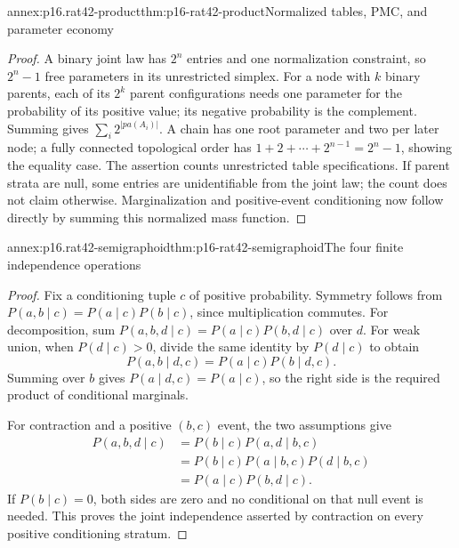 \begin{annexitem}{annex:p16.rat42-product}{thm:p16-rat42-product}{Normalized tables, PMC, and parameter economy}
\begin{proof}
A binary joint law has \(2^n\) entries and one normalization constraint,
so \(2^n-1\) free parameters in its unrestricted simplex. For a node
with \(k\) binary parents, each of its \(2^k\) parent configurations
needs one parameter for the probability of its positive value; its
negative probability is the complement. Summing gives
\(\sum_i2^{|pa(A_i)|}\). A chain has one root parameter and two
per later node; a fully connected topological order has
\(1+2+\cdots+2^{n-1}=2^n-1\), showing the equality case.
The assertion counts unrestricted table specifications. If parent
strata are null, some entries are unidentifiable from the joint law;
the count does not claim otherwise. Marginalization and positive-event
conditioning now follow directly by summing this normalized mass function.
\end{proof}
\end{annexitem}

\begin{annexitem}{annex:p16.rat42-semigraphoid}{thm:p16-rat42-semigraphoid}{The four finite independence operations}
\begin{proof}
Fix a conditioning tuple \(c\) of positive probability. Symmetry follows
from \(P(a,b\mid c)=P(a\mid c)P(b\mid c)\), since multiplication
commutes. For decomposition, sum
\(P(a,b,d\mid c)=P(a\mid c)P(b,d\mid c)\) over \(d\).
For weak union, when \(P(d\mid c)>0\), divide the same identity
by \(P(d\mid c)\) to obtain
\[
 P(a,b\mid d,c)=P(a\mid c)P(b\mid d,c).
\]
Summing over \(b\) gives \(P(a\mid d,c)=P(a\mid c)\), so the
right side is the required product of conditional marginals.

For contraction and a positive \((b,c)\) event, the two assumptions give
\[
\begin{aligned}
 P(a,b,d\mid c)
 &=P(b\mid c)P(a,d\mid b,c)\\
 &=P(b\mid c)P(a\mid b,c)P(d\mid b,c)\\
 &=P(a\mid c)P(b,d\mid c).
\end{aligned}
\]
If \(P(b\mid c)=0\), both sides are zero and no conditional on that
null event is needed. This proves the joint independence asserted
by contraction on every positive conditioning stratum.
\end{proof}
\end{annexitem}


